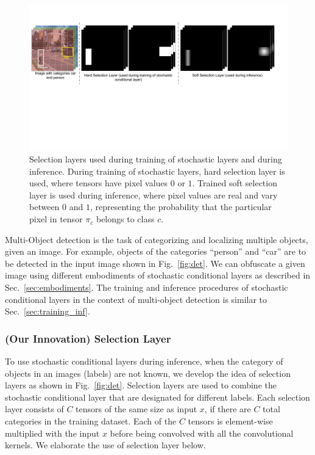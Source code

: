 \documentclass[12pt, letterpaper]{article}
\begin{document}
\begin{figure}[h!]
    \centering
    \includegraphics[width=\textwidth, trim={0cm 7cm 1cm 2cm}, clip]{category_masks.pdf}
    \caption{Selection layers used during training of stochastic layers and during inference. During training of stochastic layers, hard selection layer is used, where tensors have pixel values $0$ or $1$. Trained soft selection layer is used during inference, where pixel values are real and vary between $0$ and $1$, representing the  probability that the particular pixel in tensor $\pi_c$ belongs to class $c$.}
    \label{fig:category_masks_det}
\end{figure}

Multi-Object detection is the task of categorizing and localizing multiple objects, given an image. For example, objects of the categories ``person'' and ``car'' are to be detected in the input image shown in Fig.~\ref{fig:det}. We can obfuscate a given image using different embodiments of stochastic conditional layers as described in Sec.~\ref{sec:embodiments}. 
The training and inference procedures of stochastic conditional layers in the context of multi-object detection is similar to Sec.~\ref{sec:training_inf}.

\subsubsection{(Our Innovation) Selection Layer}
To use stochastic conditional layers during inference, when the category of objects in an images (labels) are not known, we develop the idea of selection layers as shown in Fig.~\ref{fig:det}. Selection layers are used to combine the stochastic conditional layer that are designated for different labels. Each selection layer consists of $C$ tensors of the same size as input $x$, if there are $C$ total categories in the training dataset.
Each of the $C$ tensors is element-wise multiplied with the input $x$ before being convolved with all the convolutional kernels. We elaborate the use of selection layer below.
\end{document}
